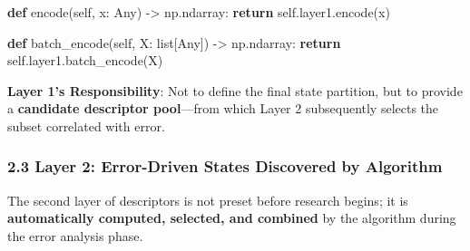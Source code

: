 \documentclass[
  12pt,
]{article}
\newenvironment{Shaded}{}{}
\newcommand{\BuiltInTok}[1]{\textcolor[rgb]{0.00,0.50,0.00}{#1}}
\newcommand{\ControlFlowTok}[1]{\textcolor[rgb]{0.00,0.44,0.13}{\textbf{#1}}}
\newcommand{\KeywordTok}[1]{\textcolor[rgb]{0.00,0.44,0.13}{\textbf{#1}}}
\newcommand{\NormalTok}[1]{#1}
\newcommand{\OperatorTok}[1]{\textcolor[rgb]{0.40,0.40,0.40}{#1}}
\newcommand{\VariableTok}[1]{\textcolor[rgb]{0.10,0.09,0.49}{#1}}
\begin{document}
\begin{Shaded}
\begin{Highlighting}[]
\KeywordTok{def}\NormalTok{ encode(}\VariableTok{self}\NormalTok{, x: Any) }\OperatorTok{{-}\textgreater{}}\NormalTok{ np.ndarray:}
    \ControlFlowTok{return} \VariableTok{self}\NormalTok{.layer1.encode(x)}

\KeywordTok{def}\NormalTok{ batch\_encode(}\VariableTok{self}\NormalTok{, X: }\BuiltInTok{list}\NormalTok{[Any]) }\OperatorTok{{-}\textgreater{}}\NormalTok{ np.ndarray:}
    \ControlFlowTok{return} \VariableTok{self}\NormalTok{.layer1.batch\_encode(X)}
\end{Highlighting}
\end{Shaded}

\textbf{Layer 1's Responsibility}: Not to define the final state partition, but to provide a \textbf{candidate descriptor pool}---from which Layer 2 subsequently selects the subset correlated with error.

\subsubsection{2.3 Layer 2: Error-Driven States Discovered by Algorithm}\label{layer-2-error-driven-states}

The second layer of descriptors is not preset before research begins; it is \textbf{automatically computed, selected, and combined} by the algorithm during the error analysis phase.
\end{document}
